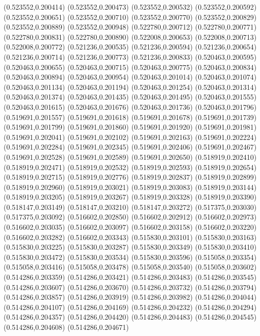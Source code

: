 (0.523552,0.200414)
(0.523552,0.200473)
(0.523552,0.200532)
(0.523552,0.200592)
(0.523552,0.200651)
(0.523552,0.200710)
(0.523552,0.200770)
(0.523552,0.200829)
(0.523552,0.200889)
(0.523552,0.200948)
(0.522780,0.200712)
(0.522780,0.200771)
(0.522780,0.200831)
(0.522780,0.200890)
(0.522008,0.200653)
(0.522008,0.200713)
(0.522008,0.200772)
(0.521236,0.200535)
(0.521236,0.200594)
(0.521236,0.200654)
(0.521236,0.200714)
(0.521236,0.200773)
(0.521236,0.200833)
(0.520463,0.200595)
(0.520463,0.200655)
(0.520463,0.200715)
(0.520463,0.200775)
(0.520463,0.200834)
(0.520463,0.200894)
(0.520463,0.200954)
(0.520463,0.201014)
(0.520463,0.201074)
(0.520463,0.201134)
(0.520463,0.201194)
(0.520463,0.201254)
(0.520463,0.201314)
(0.520463,0.201374)
(0.520463,0.201435)
(0.520463,0.201495)
(0.520463,0.201555)
(0.520463,0.201615)
(0.520463,0.201676)
(0.520463,0.201736)
(0.520463,0.201796)
(0.519691,0.201557)
(0.519691,0.201618)
(0.519691,0.201678)
(0.519691,0.201739)
(0.519691,0.201799)
(0.519691,0.201860)
(0.519691,0.201920)
(0.519691,0.201981)
(0.519691,0.202041)
(0.519691,0.202102)
(0.519691,0.202163)
(0.519691,0.202224)
(0.519691,0.202284)
(0.519691,0.202345)
(0.519691,0.202406)
(0.519691,0.202467)
(0.519691,0.202528)
(0.519691,0.202589)
(0.519691,0.202650)
(0.518919,0.202410)
(0.518919,0.202471)
(0.518919,0.202532)
(0.518919,0.202593)
(0.518919,0.202654)
(0.518919,0.202715)
(0.518919,0.202776)
(0.518919,0.202837)
(0.518919,0.202899)
(0.518919,0.202960)
(0.518919,0.203021)
(0.518919,0.203083)
(0.518919,0.203144)
(0.518919,0.203205)
(0.518919,0.203267)
(0.518919,0.203328)
(0.518919,0.203390)
(0.518147,0.203149)
(0.518147,0.203210)
(0.518147,0.203272)
(0.517375,0.203030)
(0.517375,0.203092)
(0.516602,0.202850)
(0.516602,0.202912)
(0.516602,0.202973)
(0.516602,0.203035)
(0.516602,0.203097)
(0.516602,0.203158)
(0.516602,0.203220)
(0.516602,0.203282)
(0.516602,0.203343)
(0.515830,0.203101)
(0.515830,0.203163)
(0.515830,0.203225)
(0.515830,0.203287)
(0.515830,0.203349)
(0.515830,0.203410)
(0.515830,0.203472)
(0.515830,0.203534)
(0.515830,0.203596)
(0.515058,0.203354)
(0.515058,0.203416)
(0.515058,0.203478)
(0.515058,0.203540)
(0.515058,0.203602)
(0.514286,0.203359)
(0.514286,0.203421)
(0.514286,0.203483)
(0.514286,0.203545)
(0.514286,0.203607)
(0.514286,0.203670)
(0.514286,0.203732)
(0.514286,0.203794)
(0.514286,0.203857)
(0.514286,0.203919)
(0.514286,0.203982)
(0.514286,0.204044)
(0.514286,0.204107)
(0.514286,0.204169)
(0.514286,0.204232)
(0.514286,0.204294)
(0.514286,0.204357)
(0.514286,0.204420)
(0.514286,0.204483)
(0.514286,0.204545)
(0.514286,0.204608)
(0.514286,0.204671)

